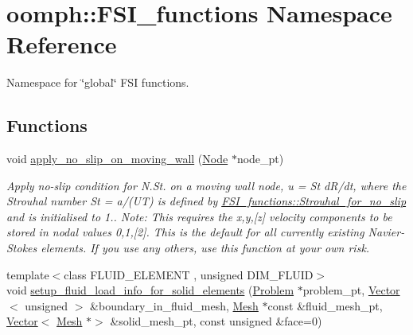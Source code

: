 \hypertarget{namespaceoomph_1_1FSI__functions}{}\section{oomph\+:\+:F\+S\+I\+\_\+functions Namespace Reference}
\label{namespaceoomph_1_1FSI__functions}


Namespace for \char`\"{}global\char`\"{} F\+SI functions.  


\subsection*{Functions}
\begin{DoxyCompactItemize}
\item 
void \hyperlink{namespaceoomph_1_1FSI__functions_ac1a95cf31d719f6aeceb72554ee75868}{apply\+\_\+no\+\_\+slip\+\_\+on\+\_\+moving\+\_\+wall} (\hyperlink{classoomph_1_1Node}{Node} $\ast$node\+\_\+pt)
\begin{DoxyCompactList}\small\item\em Apply no-\/slip condition for N.\+St. on a moving wall node, u = St d\+R/dt, where the Strouhal number St = a/(UT) is defined by \hyperlink{namespaceoomph_1_1FSI__functions_aa213854665524b0720b63a115ef57fd8}{F\+S\+I\+\_\+functions\+::\+Strouhal\+\_\+for\+\_\+no\+\_\+slip} and is initialised to 1.. Note\+: This requires the x,y,\mbox{[}z\mbox{]} velocity components to be stored in nodal values 0,1,\mbox{[}2\mbox{]}. This is the default for all currently existing Navier-\/\+Stokes elements. If you use any others, use this function at your own risk. \end{DoxyCompactList}\item 
{\footnotesize template$<$class F\+L\+U\+I\+D\+\_\+\+E\+L\+E\+M\+E\+NT , unsigned D\+I\+M\+\_\+\+F\+L\+U\+ID$>$ }\\void \hyperlink{namespaceoomph_1_1FSI__functions_a15e44de21e004a7aed5fd352fb3d8967}{setup\+\_\+fluid\+\_\+load\+\_\+info\+\_\+for\+\_\+solid\+\_\+elements} (\hyperlink{classoomph_1_1Problem}{Problem} $\ast$problem\+\_\+pt, \hyperlink{classoomph_1_1Vector}{Vector}$<$ unsigned $>$ \&boundary\+\_\+in\+\_\+fluid\+\_\+mesh, \hyperlink{classoomph_1_1Mesh}{Mesh} $\ast$const \&fluid\+\_\+mesh\+\_\+pt, \hyperlink{classoomph_1_1Vector}{Vector}$<$ \hyperlink{classoomph_1_1Mesh}{Mesh} $\ast$$>$ \&solid\+\_\+mesh\+\_\+pt, const unsigned \&face=0)
$$
\end{DoxyCompactItemize}
